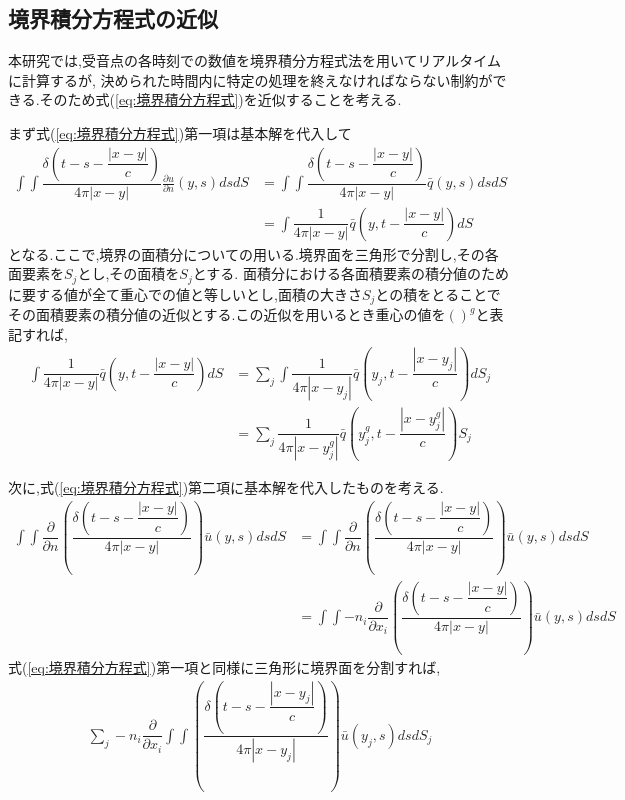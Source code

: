 \documentclass[dvipdfmx]{ampbt}
\begin{document}
\subsection{境界積分方程式の近似}
\label{kinji}
本研究では,受音点の各時刻での数値を境界積分方程式法を用いてリアルタイムに計算するが,%
決められた時間内に特定の処理を終えなければならない制約ができる.そのため式(\ref{eq:境界積分方程式})を近似することを考える.\par
まず式(\ref{eq:境界積分方程式})第一項は基本解を代入して
\begin{align}
\int\!\!\!\int \dfrac{\delta(t-s-\dfrac{|x-y|}{c})}{4\pi|x-y|} \frac{\partial u}{\partial n}(y,s)dsdS
&= \int\!\!\!\int \dfrac{\delta(t-s-\dfrac{|x-y|}{c})}{4\pi|x-y|} \bar{q}(y,s)dsdS\\
&= \int\!\!\! \dfrac{1}{4\pi|x-y|} \bar{q}(y,t-\dfrac{|x-y|}{c})dS
\end{align}
となる.ここで,境界の面積分についての用いる.境界面を三角形で分割し,その各面要素を$S_j$とし,その面積を$S_j$とする.
面積分における各面積要素の積分値のために要する値が全て重心での値と等しいとし,面積の大きさ$S_j$との積をとることで
その面積要素の積分値の近似とする.この近似を用いるとき重心の値を$( )^g$と表記すれば,
\begin{align}
\int\!\!\! \dfrac{1}{4\pi|x-y|} \bar{q}(y,t-\dfrac{|x-y|}{c})dS &= \sum_j \int\!\!\! \dfrac{1}{4\pi|x-y_j|} \bar{q}(y_j,t-\dfrac{|x-y_j|}{c})dS_j \nonumber \\
&=\sum_j \dfrac{1}{4\pi|x-y_j^g|} \bar{q}(y_j^g,t-\dfrac{|x-y_j^g|}{c})S_j
\end{align}
\par
次に,式(\ref{eq:境界積分方程式})第二項に基本解を代入したものを考える.
\begin{align}
\int\!\!\!\int \dfrac{\partial}{\partial n}\left( \dfrac{\delta(t-s-\dfrac{|x-y|}{c})}{4\pi|x-y|} \right) \bar{u}(y,s) ds dS
&= \int\!\!\!\int \dfrac{\partial}{\partial n}\left( \dfrac{\delta(t-s-\dfrac{|x-y|}{c})}{4\pi|x-y|} \right) \bar{u}(y,s) ds dS \nonumber \\
&= \int\!\!\!\int -n_i\dfrac{\partial}{\partial x_i}\left( \dfrac{\delta(t-s-\dfrac{|x-y|}{c})}{4\pi|x-y|} \right) \bar{u}(y,s) ds dS
\end{align}
式(\ref{eq:境界積分方程式})第一項と同様に三角形に境界面を分割すれば,
\begin{align}
\sum_j -n_i\dfrac{\partial}{\partial x_i}\int\!\!\!\int \left( \dfrac{\delta(t-s-\dfrac{|x-y_j|}{c})}{4\pi|x-y_j|} \right) \bar{u}(y_j,s) ds dS_j
\end{align}
\end{document}
